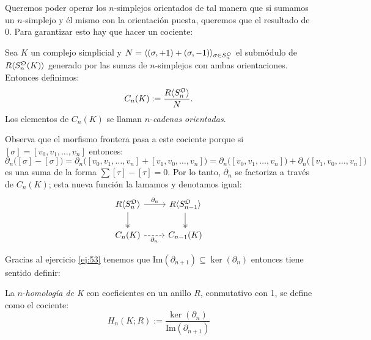 \documentclass[../../topologia_algebraica]{subfiles}
\begin{document}
Queremos poder operar los $n$-simplejos orientados de tal manera que si sumamos un $n$-simplejo
y \'el mismo con la orientaci\'on puesta, queremos que el resultado de 0. Para garantizar esto hay
que hacer un cociente:

\begin{defin}
	Sea $K$ un complejo simplicial y $N=\langle (\sigma,+1)+(\sigma,-1) \rangle_{\sigma\in S_n^{\mathfrak{O}}}$ el
	subm\'odulo de $R\langle S_n^{\mathfrak{O}}(K) \rangle$ generado por las sumas de $n$-simplejos con ambas
	orientaciones. Entonces definimos:
	\[
		C_n(K):=\frac{R\langle S_n^{\mathfrak{O}} \rangle}{N}.
	\]
	Los elementos de $C_n(K)$ se llaman $n$-\emph{cadenas orientadas}.
\end{defin}

Observa que el morfismo frontera pasa a este cociente porque si $[\sigma]=[v_0,v_1,\ldots,v_n]$ entonces:
\[
	\partial_n\big( [\sigma]-[\sigma]\big)=
	\partial_n\big([v_0,v_1,\ldots,v_n]+[v_1,v_0,\ldots,v_n]\big)=
	\partial_n\big([v_0,v_1,\ldots,v_n]\big)+\partial_n\big([v_1,v_0,\ldots,v_n]\big)
\]
es una suma de la forma $\sum [\tau]-[\tau]=0$. Por lo tanto, $\partial_n$ se factoriza a trav\'es de
$C_n(K)$; esta nueva funci\'on la lamamos y denotamos igual:
\[
	\begin{tikzcd}
		R\gen{S_{n}^\fO} \arrow[r,"\partial_n"] \arrow[d,two heads] & R\gen{S_{n-1}^\fO} \arrow[d,two heads] \\
		C_n(K) \arrow[r,dashed,"\partial_n"'] & C_{n-1}(K)
	\end{tikzcd}
\]

Gracias al ejercicio \ref{ej:53} tenemos que Im$(\partial_{n+1})\subseteq\ker(\partial_{n})$ entonces tiene
sentido definir:

\begin{defin}
	La $n$-\emph{homolog\'ia de K} con coeficientes en un anillo $R$, conmutativo con 1, se define como
	el cociente:
	\[
		H_n(K;R):=\frac{\ker(\partial_n)}{\text{Im}(\partial_{n+1})}
	\]
\end{defin}
\end{document}
